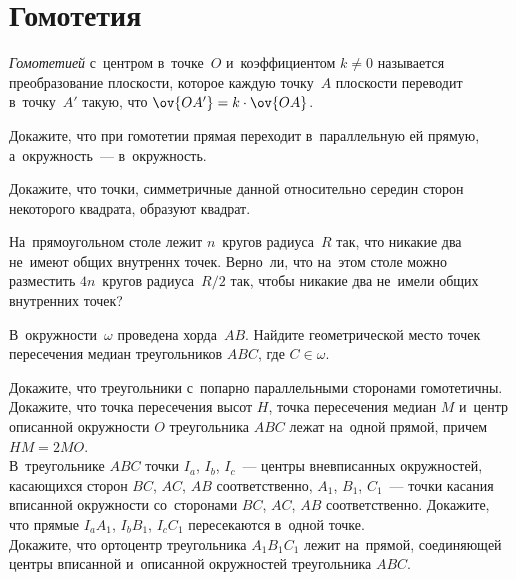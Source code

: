 
\section*{Гомотетия}


\emph{Гомотетией} с~центром в~точке~$O$ и~коэффициентом $k \neq 0$ называется
преобразование плоскости, которое каждую точку~$A$ плоскости переводит
в~точку~$A'$ такую, что $\ov{OA'} = k \cdot \ov{OA}$.

\begin{problems}

\item
Докажите, что при гомотетии прямая переходит в~параллельную ей прямую,
а~окружность~--- в~окружность.

\item
Докажите, что точки, симметричные данной относительно середин сторон
некоторого квадрата, образуют квадрат.

\item
На~прямоугольном столе лежит $n$~кругов радиуса~$R$ так, что никакие два
не~имеют общих внутреннх точек.
Верно~ли, что на~этом столе можно разместить $4 n$~кругов радиуса~$R / 2$ так,
чтобы никакие два не~имели общих внутренних точек?

\item
В~окружности~$\omega$ проведена хорда~$AB$.
Найдите геометрической место точек пересечения медиан треугольников $ABC$, где
$C \in \omega$.

\item
\subproblem
Докажите, что треугольники с~попарно параллельными сторонами гомотетичны.
\\
\subproblem
Докажите, что точка пересечения высот $H$, точка пересечения медиан $M$
и~центр описанной окружности $O$ треугольника $ABC$ лежат на~одной прямой,
причем $HM = 2 MO$.
\\
\subproblem
В~треугольнике $ABC$ точки $I_{a}$, $I_{b}$, $I_{c}$~--- центры вневписанных
окружностей, касающихся сторон $BC$, $AC$, $AB$ соответственно,
$A_1$, $B_1$, $C_1$~--- точки касания вписанной окружности со~сторонами
$BC$, $AC$, $AB$ соответственно.
Докажите, что прямые $I_{a} A_1$, $I_{b} B_1$, $I_{c} C_1$ пересекаются
в~одной точке.
\\
\subproblem
Докажите, что ортоцентр треугольника $A_1 B_1 C_1$ лежит на~прямой, соединяющей
центры вписанной и~описанной окружностей треугольника $ABC$.


\end{problems}
